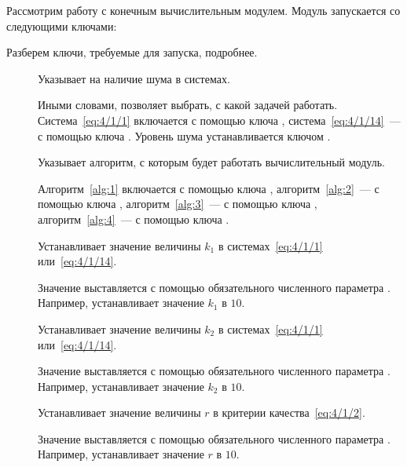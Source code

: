 \newpage

Рассмотрим работу с конечным вычислительным модулем. Модуль запускается со следующими ключами:


Разберем ключи, требуемые для запуска, подробнее.

\begin{description}
	\item[]
		Указывает на наличие шума в системах.
		
		Иными словами, позволяет выбрать, с какой задачей работать. Система~\ref{eq:4/1/1} включается с помощью ключа , система~\ref{eq:4/1/14}~--- с помощью ключа . Уровень шума устанавливается ключом .
		
	\item[]
		Указывает алгоритм, с которым будет работать вычислительный модуль.
		
		Алгоритм~\vref{alg:1} включается с помощью ключа , алгоритм~\vref{alg:2}~--- с помощью ключа , алгоритм~\vref{alg:3}~--- с помощью ключа , алгоритм~\vref{alg:4}~--- с помощью ключа .
	
	\item[]
		Устанавливает значение величины $k_1$ в системах~\ref{eq:4/1/1} или~\ref{eq:4/1/14}.
		
		Значение выставляется с помощью обязательного численного параметра . Например,  устанавливает значение $k_1$ в $10$.
		
	\item[]
		Устанавливает значение величины $k_2$ в системах~\ref{eq:4/1/1} или~\ref{eq:4/1/14}.
		
		Значение выставляется с помощью обязательного численного параметра . Например,  устанавливает значение $k_2$ в $10$.
		
	\item[]
		Устанавливает значение величины $r$ в критерии качества~\ref{eq:4/1/2}.
		
		Значение выставляется с помощью обязательного численного параметра . Например,  устанавливает значение $r$ в $10$.
		

\end{description}

